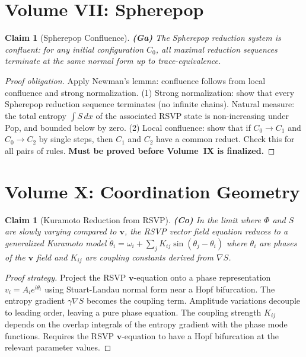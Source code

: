 \documentclass[11pt, a4paper]{book}
\theoremstyle{flyxion}
\newtheorem{claim}[theorem]{Claim}
\theoremstyle{remark}
\begin{document}
\section{Volume VII: Spherepop}

\begin{claim}[Spherepop Confluence] \textbf{(Ga)}
The Spherepop reduction system is confluent: for any initial
configuration $C_0$, all maximal reduction sequences terminate
at the same normal form up to trace-equivalence.
\end{claim}
\begin{proof}[Proof obligation]
Apply Newman's lemma: confluence follows from local confluence and
strong normalization. (1) Strong normalization: show that every
Spherepop reduction sequence terminates (no infinite chains). Natural
measure: the total entropy $\int S\,dx$ of the associated RSVP
state is non-increasing under Pop, and bounded below by zero.
(2) Local confluence: show that if $C_0 \to C_1$ and $C_0 \to C_2$
by single steps, then $C_1$ and $C_2$ have a common reduct.
Check this for all pairs of rules. \textbf{Must be proved before
Volume~IX is finalized.}
\end{proof}

\section{Volume X: Coordination Geometry}

\begin{claim}[Kuramoto Reduction from RSVP] \textbf{(Co)}
In the limit where $\Phi$ and $S$ are slowly varying compared to
$\mathbf{v}$, the RSVP vector field equation reduces to a
generalized Kuramoto model $\dot\theta_i = \omega_i +
\sum_j K_{ij}\sin(\theta_j - \theta_i)$ where $\theta_i$ are
phases of the $\mathbf{v}$ field and $K_{ij}$ are coupling
constants derived from $\nabla S$.
\end{claim}
\begin{proof}[Proof strategy]
Project the RSVP $\mathbf{v}$-equation onto a phase representation
$v_i = A_i e^{i\theta_i}$ using Stuart-Landau normal form near
a Hopf bifurcation. The entropy gradient $\gamma\nabla S$ becomes
the coupling term. Amplitude variations decouple to leading order,
leaving a pure phase equation. The coupling strength $K_{ij}$ depends
on the overlap integrals of the entropy gradient with the phase
mode functions. Requires the RSVP $\mathbf{v}$-equation to have
a Hopf bifurcation at the relevant parameter values.
\end{proof}
\end{document}
